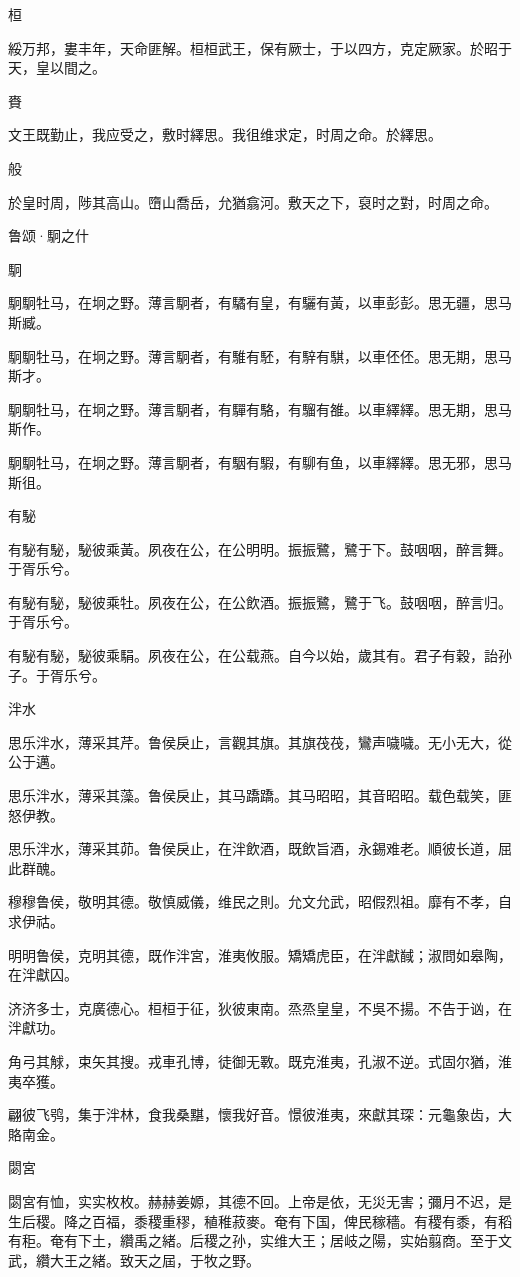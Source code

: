 桓

綏万邦，婁丰年，天命匪解。桓桓武王，保有厥士，于以四方，克定厥家。於昭于天，皇以間之。

賚

文王既勤止，我应受之，敷时繹思。我徂维求定，时周之命。於繹思。

般

於皇时周，陟其高山。嶞山喬岳，允猶翕河。敷天之下，裒时之對，时周之命。




鲁颂·駉之什


駉

駉駉牡马，在坰之野。薄言駉者，有驈有皇，有驪有黃，以車彭彭。思无疆，思马斯臧。

駉駉牡马，在坰之野。薄言駉者，有騅有駓，有騂有騏，以車伾伾。思无期，思马斯才。

駉駉牡马，在坰之野。薄言駉者，有驒有駱，有騮有雒。以車繹繹。思无期，思马斯作。

駉駉牡马，在坰之野。薄言駉者，有駰有騢，有駠有鱼，以車繹繹。思无邪，思马斯徂。

有駜

有駜有駜，駜彼乘黃。夙夜在公，在公明明。振振鷺，鷺于下。鼓咽咽，醉言舞。于胥乐兮。

有駜有駜，駜彼乘牡。夙夜在公，在公飲酒。振振鷺，鷺于飞。鼓咽咽，醉言归。于胥乐兮。

有駜有駜，駜彼乘駽。夙夜在公，在公载燕。自今以始，歲其有。君子有穀，詒孙子。于胥乐兮。

泮水

思乐泮水，薄采其芹。鲁侯戾止，言觀其旗。其旗茷茷，鸞声噦噦。无小无大，從公于邁。

思乐泮水，薄采其藻。鲁侯戾止，其马蹻蹻。其马昭昭，其音昭昭。载色载笑，匪怒伊教。

思乐泮水，薄采其茆。鲁侯戾止，在泮飲酒，既飲旨酒，永錫难老。順彼长道，屈此群醜。

穆穆鲁侯，敬明其德。敬慎威儀，维民之則。允文允武，昭假烈祖。靡有不孝，自求伊祜。

明明鲁侯，克明其德，既作泮宮，淮夷攸服。矯矯虎臣，在泮獻馘；淑問如皋陶，在泮獻囚。

济济多士，克廣德心。桓桓于征，狄彼東南。烝烝皇皇，不吳不揚。不告于讻，在泮獻功。

角弓其觩，束矢其搜。戎車孔博，徒御无斁。既克淮夷，孔淑不逆。式固尔猶，淮夷卒獲。

翩彼飞鸮，集于泮林，食我桑黮，懷我好音。憬彼淮夷，來獻其琛：元龜象齿，大賂南金。

閟宮

閟宮有恤，实实枚枚。赫赫姜嫄，其德不回。上帝是依，无災无害；彌月不迟，是生后稷。降之百福，黍稷重穋，稙稚菽麥。奄有下国，俾民稼穡。有稷有黍，有稻有秬。奄有下土，纘禹之緒。后稷之孙，实维大王；居岐之陽，实始翦商。至于文武，纘大王之緒。致天之屆，于牧之野。

